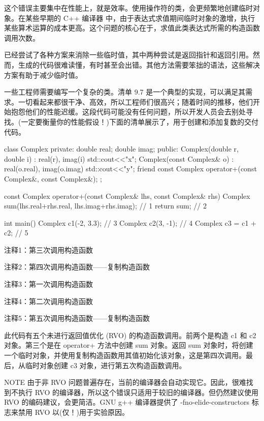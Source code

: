 这个错误主要集中在性能上，就是效率。使用操作符的类，会更频繁地创建临时对象。在某些早期的 C++ 编译器 中，由于表达式求值期间临时对象的激增，执行某些算术运算的成本更高。这个问题的核心在于，求值此类表达式所需的构造函数调用次数。

已经尝试了各种方案来消除一些临时值，其中两种尝试是返回指针和返回引用。然而，生成的代码很难读懂，有时甚至会出错。其他方法需要笨拙的语法，这些解决方案有助于减少临时值。


一些工程师需要编写一个复杂的类。清单 9.7 是一个典型的实现，可以满足其需求。一切看起来都很干净、高效，所以工程师们很高兴；随着时间的推移，他们开始抱怨他们的性能迟缓。这段代码可能没有任何问题，所以开发人员会去别处寻找。(一定要衡量你的性能假设！)下面的清单展示了，用于创建和添加复数的交付代码。


\begin{cpp}
class Complex {
private:
  double real;
  double imag;
public:
  Complex(double r, double i) : real(r), imag(i) {std::cout<<"x\n";}
  Complex(const Complex& o) : real(o.real), imag(o.imag)
    { std::cout<<"y\n"; }
  friend const Complex operator+(const Complex&, const Complex&);
};

const Complex operator+(const Complex& lhs, const Complex& rhs) {
  Complex sum(lhs.real+rhs.real, lhs.imag+rhs.imag); // 1
  return sum; // 2
}

int main() {
  Complex c1(-2, 3.3); // 3
  Complex c2(3, -1); // 4
  Complex c3 = c1 + c2; // 5
}
\end{cpp}

{\footnotesize
注释1：第三次调用构造函数

注释2：第四次调用构造函数——复制构造函数

注释3：第一次调用构造函数

注释4：第二次调用构造函数

注释5：第五次调用构造函数——复制构造函数
}

此代码有五个未进行返回值优化 (RVO) 的构造函数调用。前两个是构造 c1 和 c2 对象。第三个是在 operator+ 方法中创建 sum 对象。返回 sum 对象时，将创建一个临时对象，并使用复制构造函数用其值初始化该对象，这是第四次调用。最后，从临时对象创建 c3 对象，进行第五次构造函数调用。

\begin{myNotic}{NOTE}
由于非 RVO 问题普遍存在，当前的编译器会自动实现它。因此，很难找到不执行 RVO 的编译器，所以这个错误只适用于较旧的编译器。但仍然建议使用 RVO 的编码建议，会更简洁。GNU g++ 编译器提供了 -fno-elide-constructors 标志来禁用 RVO 以(仅！)用于实验原因。
\end{myNotic}


